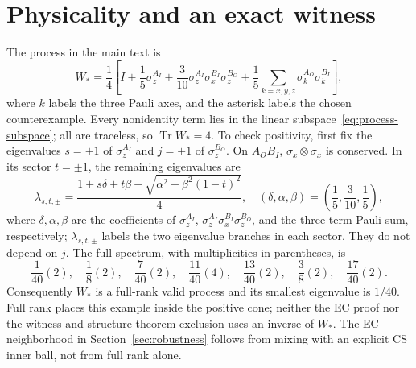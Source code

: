 \documentclass[11pt]{article}
\newcommand{\Tr}{\operatorname{Tr}}
\begin{document}
\section{Physicality and an exact witness}
The process in the main text is
\begin{equation}
 W_* =\frac14\left[I+\frac15\sigma_z^{A_I}
 +\frac3{10}\sigma_z^{A_I}\sigma_x^{B_I}\sigma_z^{B_O}
 +\frac15\sum_{k=x,y,z}\sigma_k^{A_O}\sigma_k^{B_I}\right],
 \label{eq:Wstar}
\end{equation}
where $k$ labels the three Pauli axes, and the asterisk labels the chosen counterexample. Every nonidentity term lies in the linear subspace~\eqref{eq:process-subspace}; all are traceless, so $\Tr W_*=4$. To check positivity, first fix the eigenvalues $s=\pm1$ of $\sigma_z^{A_I}$ and $j=\pm1$ of $\sigma_z^{B_O}$. On $A_OB_I$, $\sigma_x\otimes\sigma_x$ is conserved. In its sector $t=\pm1$, the remaining eigenvalues are
\begin{equation}
 \lambda_{s,t,\pm}=
 \frac{1+s\delta+t\beta\pm
 \sqrt{\alpha^2+\beta^2(1-t)^2}}4,
 \quad (\delta,\alpha,\beta)=\left(\frac15,\frac3{10},\frac15\right),
 \label{eq:spectrum-formula}
\end{equation}
where $\delta,\alpha,\beta$ are the coefficients of $\sigma_z^{A_I}$, $\sigma_z^{A_I}\sigma_x^{B_I}\sigma_z^{B_O}$, and the three-term Pauli sum, respectively; $\lambda_{s,t,\pm}$ labels the two eigenvalue branches in each sector. They do not depend on $j$. The full spectrum, with multiplicities in parentheses, is
\begin{equation}
 \frac1{40}(2),\quad\frac18(2),\quad\frac7{40}(2),\quad
 \frac{11}{40}(4),\quad\frac{13}{40}(2),\quad
 \frac38(2),\quad\frac{17}{40}(2).
 \label{eq:spectrum}
\end{equation}
Consequently $W_*$ is a full-rank valid process and its smallest eigenvalue is $1/40$. Full rank places this example inside the positive cone; neither the EC proof nor the witness and structure-theorem exclusion uses an inverse of $W_*$. The EC neighborhood in Section~\ref{sec:robustness} follows from mixing with an explicit CS inner ball, not from full rank alone.
\end{document}
